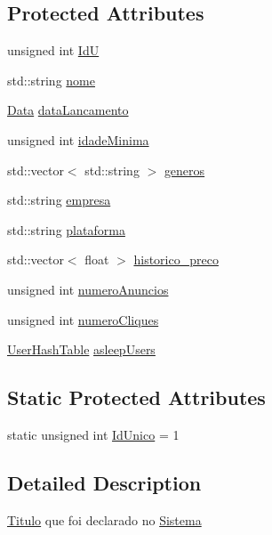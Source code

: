 \subsection*{Protected Attributes}
\begin{DoxyCompactItemize}
\item 
unsigned int \hyperlink{classTitulo_aff7d1cc9accbc0f49c05cdc97c66844c}{IdU}
\item 
std\+::string \hyperlink{classTitulo_a8abdf1fc6d4fc14be20bbec247664d83}{nome}
\item 
\hyperlink{classData}{Data} \hyperlink{classTitulo_ae540ddf2c607eb0e4de29eb8c0cca7f0}{data\+Lancamento}
\item 
unsigned int \hyperlink{classTitulo_a28891078f53fc3317de60ae739514955}{idade\+Minima}
\item 
std\+::vector$<$ std\+::string $>$ \hyperlink{classTitulo_a3209265c8534416978ee9891b96c14b2}{generos}
\item 
std\+::string \hyperlink{classTitulo_a91510c440dc8583d60d88ea02f4eb1b6}{empresa}
\item 
std\+::string \hyperlink{classTitulo_a67761eb7f006453ab0869e4b7c0a9c0b}{plataforma}
\item 
std\+::vector$<$ float $>$ \hyperlink{classTitulo_aad5a44ca7e83939e8b47f1e11b80eca2}{historico\+\_\+preco}
\item 
unsigned int \hyperlink{classTitulo_a31919af9268f0c6e55b786457d1df586}{numero\+Anuncios}
\item 
unsigned int \hyperlink{classTitulo_a7775da325c14a4d76f2d3b0800c28fa3}{numero\+Cliques}
\item 
\hyperlink{Titulo_8h_a0996281e9e5d419736dec228200cfdc5}{User\+Hash\+Table} \hyperlink{classTitulo_a84e7b9dc58fbba5f048a57a0878a43e8}{asleep\+Users}
\end{DoxyCompactItemize}
\subsection*{Static Protected Attributes}
\begin{DoxyCompactItemize}
\item 
static unsigned int \hyperlink{classTitulo_a54ff099c5e3bfbf23d4326b4acc73263}{Id\+Unico} = 1
\end{DoxyCompactItemize}


\subsection{Detailed Description}
\hyperlink{classTitulo}{Titulo} que foi declarado no \hyperlink{classSistema}{Sistema} 

